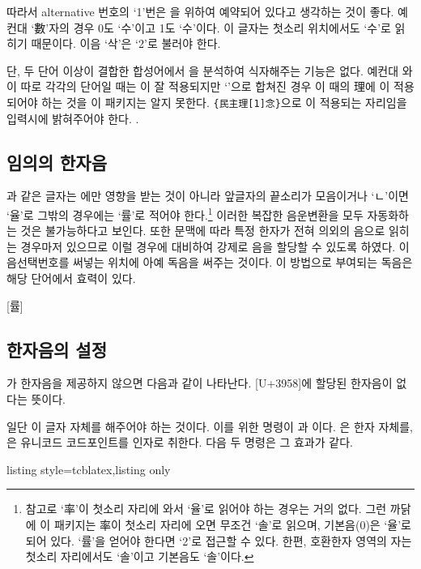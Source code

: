 \documentclass[a4paper,12pt,itemph,footnote]{oblivoir}
\begin{document}
\noindent
따라서 alternative 번호의 `1'번은 을 위하여 예약되어 있다고 생각하는 것이 좋다.
예컨대 `數'자의 경우 0도 `수'이고 1도 `수'이다. 이 글자는 첫소리 위치에서도 `수'로
읽히기 때문이다. 이음 `삭'은 `2'로 불러야 한다.
\begin{myexam}[]
   
\end{myexam}

단, 두 단어 이상이 결합한 합성어에서 을 분석하여 식자해주는 기능은 없다. 예컨대 
와 이 따로 각각의 단어일 때는 이 잘 적용되지만
`'으로 합쳐진 경우 이 때의 理에 이 적용되어야 하는 것을 이 패키지는 알지 못한다.
\verb|{民主理[1]念}|으로 이 적용되는 자리임을 입력시에 밝혀주어야 한다.
.

\subsection{임의의 한자음}\label{sec:force}

과 같은 글자는 에만 영향을 받는 것이 아니라 앞글자의 끝소리가
모음이거나 `ㄴ'이면 `율'로 그밖의 경우에는 `률'로 적어야 한다.\footnote{%
	참고로 `率'이 첫소리 자리에 와서 `율'로 읽어야 하는 경우는 거의 없다.
	그런 까닭에 이 패키지는 率이 첫소리 자리에 오면 무조건 `솔'로 읽으며,
	기본음(0)은 `율'로 되어 있다. `률'을 얻어야 한다면 `2'로 접근할 수 있다.
	한편, 호환한자 영역의 자는 첫소리 자리에서도 `솔'이고
	기본음도 `솔'이다.
}
이러한 복잡한 음운변환을 모두 자동화하는 것은 불가능하다고 보인다.
또한 문맥에 따라 특정 한자가 전혀 의외의 음으로 읽히는 경우마저 있으므로
이럴 경우에 대비하여 강제로 음을 할당할 수 있도록 하였다. 이음선택번호를 
써넣는 위치에 아예 독음을 써주는 것이다.
이 방법으로 부여되는 독음은 해당 단어에서 효력이 있다.
\begin{myexam}[]
[률]   
\end{myexam}

\subsection{한자음의 설정}\label{sec:assign}

가 한자음을 제공하지 않으면 다음과 같이 나타난다. [U+3958]에 할당된 한자음이 없다는 뜻이다.
\begin{myexam}[]
\end{myexam}
일단 이 글자 자체를 해주어야 하는 것이다. 이를 위한 명령이
과 이다.
은 한자 자체를, 은 유니코드 코드포인트를 인자로 취한다.
다음 두 명령은 그 효과가 같다.
\begin{tcblisting}{listing style=tcblatex,listing only}
\end{tcblisting}
\end{document}
